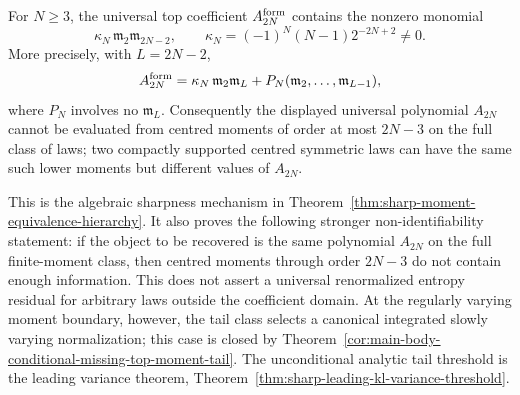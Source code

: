 \begin{proposition}%
\label{prop:poisson-kl-moment-threshold-sharpness}
\label{prop:analytic-first-evaluability-obstruction}
For \(N\ge3\), the universal top coefficient \(A_{2N}^{\rm form}\) contains
the nonzero monomial
\[
\kappa_N\,\mathfrak m_2\mathfrak m_{2N-2},
\qquad
\kappa_N=(-1)^N(N-1)2^{-2N+2}\ne0 .
\]
More precisely, with \(L=2N-2\),
\[
  A_{2N}^{\rm form}
  =\kappa_N\,\mathfrak m_2\mathfrak m_L
  +P_N(\mathfrak m_2,\ldots,\mathfrak m_{L-1}),
\]
where \(P_N\) involves no \(\mathfrak m_L\).  Consequently the displayed
universal polynomial \(A_{2N}\) cannot be evaluated from centred moments of
order at most \(2N-3\) on the full class of laws; two compactly supported
centred symmetric laws can have the same such lower moments but different
values of \(A_{2N}\).

This is the algebraic sharpness mechanism in
Theorem~\ref{thm:sharp-moment-equivalence-hierarchy}.  It also proves the
following stronger non-identifiability statement: if the object to be
recovered is the same polynomial \(A_{2N}\) on the full finite-moment class,
then centred moments through order \(2N-3\) do not contain enough
information.  This does not assert a universal renormalized entropy residual
for arbitrary laws outside the coefficient domain.  At the regularly varying
moment boundary, however, the tail class selects a canonical integrated
slowly varying normalization; this case is closed by
Theorem~\ref{cor:main-body-conditional-missing-top-moment-tail}.  The
unconditional analytic tail threshold is the leading variance theorem,
Theorem~\ref{thm:sharp-leading-kl-variance-threshold}.
\end{proposition}

